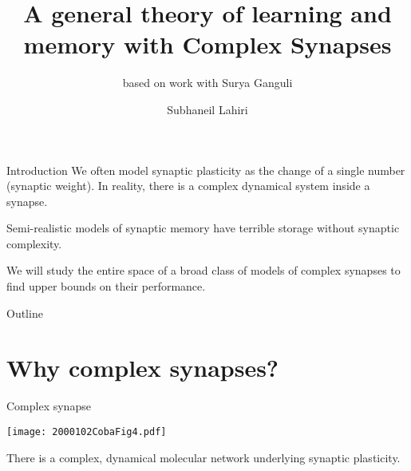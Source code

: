 \documentclass{beamer}%
\title[Complex synapses]{A general theory of learning and memory with Complex Synapses}
\subtitle{\small{based on work with Surya Ganguli}
}
\author{Subhaneil Lahiri%
}
\institute[Stanford]{%
Stanford University, Applied Physics
}
\begin{document}

\begin{frame}
%
 \titlepage
%
\end{frame}


\begin{frame}{Introduction}
%
 We often model synaptic plasticity as the change of a single number (synaptic weight).
 In reality, there is a complex dynamical system inside a synapse.

 \vp Semi-realistic models of synaptic memory have terrible storage without synaptic complexity.

 \vp We will study the entire space of a broad class of models of complex synapses to find upper bounds on their performance.

%
\end{frame}


\begin{frame}{Outline}
%
 \tableofcontents[hideallsubsections]
%
\end{frame}


\section{Why complex synapses?}


\begin{frame}{Complex synapse}
%
 \begin{center}
 \texttt{[image: 2000102CobaFig4.pdf]}
 \end{center} 
 There is a complex, dynamical molecular network underlying synaptic plasticity.     
%
\end{frame}
\end{document}
